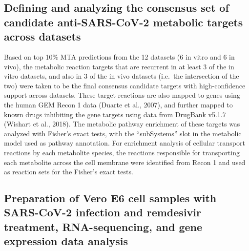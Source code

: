 \documentclass[12pt,twoside,openany,\mydriver]{thesis}  %
\begin{document}
\hypertarget{defining-and-analyzing-the-consensus-set-of-candidate-anti-sars-cov-2-metabolic-targets-across-datasets}{%
\subsection{Defining and analyzing the consensus set of candidate anti-SARS-CoV-2 metabolic targets across datasets}\label{defining-and-analyzing-the-consensus-set-of-candidate-anti-sars-cov-2-metabolic-targets-across-datasets}}

Based on top 10\% MTA predictions from the 12 datasets (6 in vitro and 6 in vivo), the metabolic reaction targets that are recurrent in at least 3 of the in vitro datasets, and also in 3 of the in vivo datasets (i.e.~the intersection of the two) were taken to be the final consensus candidate targets with high-confidence support across datasets. These target reactions are also mapped to genes using the human GEM Recon 1 data (Duarte et al., 2007), and further mapped to known drugs inhibiting the gene targets using data from DrugBank v5.1.7 (Wishart et al., 2018). The metabolic pathway enrichment of these targets was analyzed with Fisher's exact tests, with the ``subSystems'' slot in the metabolic model used as pathway annotation. For enrichment analysis of cellular transport reactions by each metabolite species, the reactions responsible for transporting each metabolite across the cell membrane were identified from Recon 1 and used as reaction sets for the Fisher's exact tests.

\hypertarget{preparation-of-vero-e6-cell-samples-with-sars-cov-2-infection-and-remdesivir-treatment-rna-sequencing-and-gene-expression-data-analysis}{%
\subsection{Preparation of Vero E6 cell samples with SARS-CoV-2 infection and remdesivir treatment, RNA-sequencing, and gene expression data analysis}\label{preparation-of-vero-e6-cell-samples-with-sars-cov-2-infection-and-remdesivir-treatment-rna-sequencing-and-gene-expression-data-analysis}}
\end{document}
